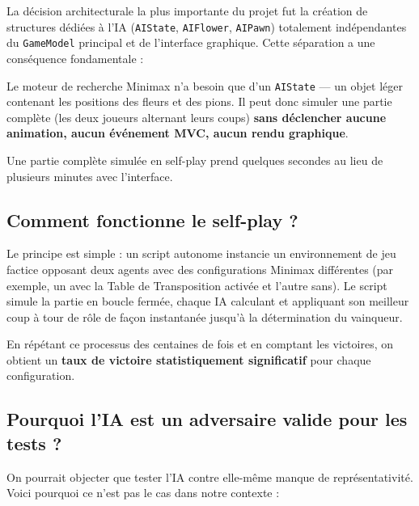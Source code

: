 \documentclass[12pt, a4paper]{article}
\begin{document}
La d\'ecision architecturale la plus importante du projet fut la cr\'eation de structures d\'edi\'ees \`a l'IA (\texttt{AIState}, \texttt{AIFlower}, \texttt{AIPawn}) totalement ind\'ependantes du \texttt{GameModel} principal et de l'interface graphique. Cette s\'eparation a une cons\'equence fondamentale :

\begin{tcolorbox}[colback=secondary!5!white,colframe=secondary,title=\textbf{Cons\'equence cl\'e : L'IA peut jouer sans interface graphique}]
Le moteur de recherche Minimax n'a besoin que d'un \texttt{AIState} --- un objet l\'eger contenant les positions des fleurs et des pions. Il peut donc simuler une partie compl\`ete (les deux joueurs alternant leurs coups) \textbf{sans d\'eclencher aucune animation, aucun \'ev\'enement MVC, aucun rendu graphique}.

Une partie compl\`ete simul\'ee en self-play prend quelques secondes au lieu de plusieurs minutes avec l'interface.
\end{tcolorbox}

\subsection{Comment fonctionne le self-play ?}

Le principe est simple : un script autonome instancie un environnement de jeu factice opposant deux agents avec des configurations Minimax diff\'erentes (par exemple, un avec la Table de Transposition activ\'ee et l'autre sans). Le script simule la partie en boucle ferm\'ee, chaque IA calculant et appliquant son meilleur coup \`a tour de r\^ole de fa\c{c}on instantan\'ee jusqu'\`a la d\'etermination du vainqueur.

En r\'ep\'etant ce processus des centaines de fois et en comptant les victoires, on obtient un \textbf{taux de victoire statistiquement significatif} pour chaque configuration.

\subsection{Pourquoi l'IA est un adversaire valide pour les tests ?}

On pourrait objecter que tester l'IA contre elle-m\^eme manque de repr\'esentativit\'e. Voici pourquoi ce n'est pas le cas dans notre contexte :
\end{document}

